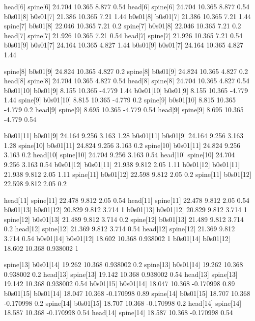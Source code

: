 head[6]    spine[6]    24.704    10.365    8.877    0.54
head[6]    spine[6]    24.704    10.365    8.877    0.54
b0s01[8]    b0s01[7]    21.386    10.365    7.21    1.44
b0s01[8]    b0s01[7]    21.386    10.365    7.21    1.44
spine[7]    b0s01[8]    22.046    10.365    7.21    0.2
spine[7]    b0s01[8]    22.046    10.365    7.21    0.2
head[7]    spine[7]    21.926    10.365    7.21    0.54
head[7]    spine[7]    21.926    10.365    7.21    0.54
b0s01[9]    b0s01[7]    24.164    10.365    4.827    1.44
b0s01[9]    b0s01[7]    24.164    10.365    4.827    1.44


spine[8]    b0s01[9]    24.824    10.365    4.827    0.2
spine[8]    b0s01[9]    24.824    10.365    4.827    0.2
head[8]    spine[8]    24.704    10.365    4.827    0.54
head[8]    spine[8]    24.704    10.365    4.827    0.54
b0s01[10]    b0s01[9]    8.155    10.365    -4.779    1.44
b0s01[10]    b0s01[9]    8.155    10.365    -4.779    1.44
spine[9]    b0s01[10]    8.815    10.365    -4.779    0.2
spine[9]    b0s01[10]    8.815    10.365    -4.779    0.2
head[9]    spine[9]    8.695    10.365    -4.779    0.54
head[9]    spine[9]    8.695    10.365    -4.779    0.54


b0s01[11]    b0s01[9]    24.164    9.256    3.163    1.28
b0s01[11]    b0s01[9]    24.164    9.256    3.163    1.28
spine[10]    b0s01[11]    24.824    9.256    3.163    0.2
spine[10]    b0s01[11]    24.824    9.256    3.163    0.2
head[10]    spine[10]    24.704    9.256    3.163    0.54
head[10]    spine[10]    24.704    9.256    3.163    0.54
b0s01[12]    b0s01[11]    21.938    9.812    2.05    1.11
b0s01[12]    b0s01[11]    21.938    9.812    2.05    1.11
spine[11]    b0s01[12]    22.598    9.812    2.05    0.2
spine[11]    b0s01[12]    22.598    9.812    2.05    0.2


head[11]    spine[11]    22.478    9.812    2.05    0.54
head[11]    spine[11]    22.478    9.812    2.05    0.54
b0s01[13]    b0s01[12]    20.829    9.812    3.714    1
b0s01[13]    b0s01[12]    20.829    9.812    3.714    1
spine[12]    b0s01[13]    21.489    9.812    3.714    0.2
spine[12]    b0s01[13]    21.489    9.812    3.714    0.2
head[12]    spine[12]    21.369    9.812    3.714    0.54
head[12]    spine[12]    21.369    9.812    3.714    0.54
b0s01[14]    b0s01[12]    18.602    10.368    0.938002    1
b0s01[14]    b0s01[12]    18.602    10.368    0.938002    1


spine[13]    b0s01[14]    19.262    10.368    0.938002    0.2
spine[13]    b0s01[14]    19.262    10.368    0.938002    0.2
head[13]    spine[13]    19.142    10.368    0.938002    0.54
head[13]    spine[13]    19.142    10.368    0.938002    0.54
b0s01[15]    b0s01[14]    18.047    10.368    -0.170998    0.89
b0s01[15]    b0s01[14]    18.047    10.368    -0.170998    0.89
spine[14]    b0s01[15]    18.707    10.368    -0.170998    0.2
spine[14]    b0s01[15]    18.707    10.368    -0.170998    0.2
head[14]    spine[14]    18.587    10.368    -0.170998    0.54
head[14]    spine[14]    18.587    10.368    -0.170998    0.54


